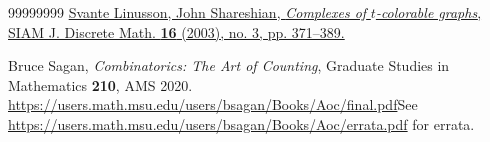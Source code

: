 \documentclass[numbers=enddot,12pt,final,onecolumn,notitlepage]{scrartcl}%
\theoremstyle{definition}
\begin{document}
\begin{thebibliography}{99999999}
%
\href{https://doi.org/10.1137/S0895480100366968}{Svante Linusson, John
Shareshian, \textit{Complexes of }$\mathit{t}$\textit{-colorable graphs}, SIAM
J. Discrete Math. \textbf{16} (2003), no. 3, pp. 371--389.}

Bruce Sagan, \textit{Combinatorics: The Art of
Counting}, Graduate Studies in Mathematics \textbf{210}, AMS 2020.\newline%
\url{https://users.math.msu.edu/users/bsagan/Books/Aoc/final.pdf}\newline See
\url{https://users.math.msu.edu/users/bsagan/Books/Aoc/errata.pdf} for errata.
\end{thebibliography}
\end{document}
